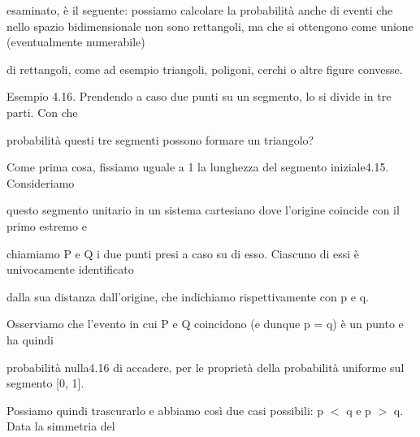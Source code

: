 \documentclass[a4paper,portrait,12pt]{article}
\begin{document}
\begin{flushleft}
esaminato, \`{e} il seguente: possiamo calcolare la probabilit\`{a} anche di eventi che nello spazio bidimensionale non sono rettangoli, ma che si ottengono come unione (eventualmente numerabile)
\end{flushleft}


\begin{flushleft}
di rettangoli, come ad esempio triangoli, poligoni, cerchi o altre figure convesse.
\end{flushleft}


\begin{flushleft}
Esempio 4.16. Prendendo a caso due punti su un segmento, lo si divide in tre parti. Con che
\end{flushleft}


\begin{flushleft}
probabilit\`{a} questi tre segmenti possono formare un triangolo?
\end{flushleft}


\begin{flushleft}
Come prima cosa, fissiamo uguale a 1 la lunghezza del segmento iniziale4.15. Consideriamo
\end{flushleft}


\begin{flushleft}
questo segmento unitario in un sistema cartesiano dove l'origine coincide con il primo estremo e
\end{flushleft}


\begin{flushleft}
chiamiamo P e Q i due punti presi a caso su di esso. Ciascuno di essi \`{e} univocamente identificato
\end{flushleft}


\begin{flushleft}
dalla sua distanza dall'origine, che indichiamo rispettivamente con p e q.
\end{flushleft}


\begin{flushleft}
Osserviamo che l'evento in cui P e Q coincidono (e dunque p = q) \`{e} un punto e ha quindi
\end{flushleft}


\begin{flushleft}
probabilit\`{a} nulla4.16 di accadere, per le propriet\`{a} della probabilit\`{a} uniforme sul segmento [0, 1].
\end{flushleft}


\begin{flushleft}
Possiamo quindi trascurarlo e abbiamo così due casi possibili: p $<$ q e p $>$ q. Data la simmetria del
\end{flushleft}
\end{document}
